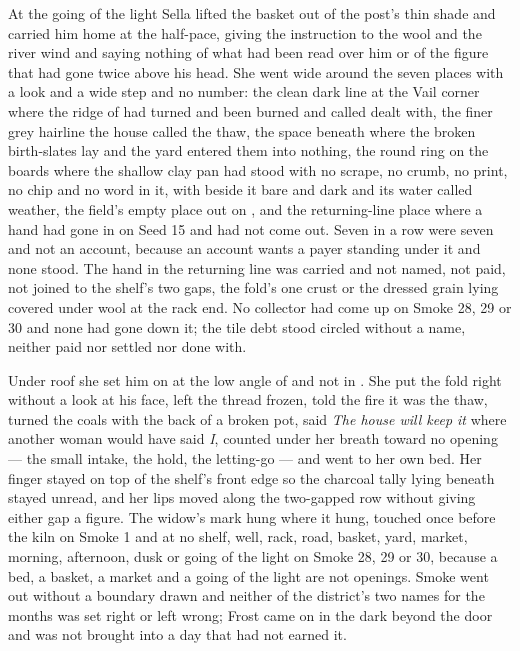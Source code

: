 \scenebreak

At the going of the light Sella lifted the basket out of the post's thin shade and carried him home at the half-pace, giving the instruction to the wool and the river wind and saying nothing of what had been read over him or of the figure that had gone twice above his head. She went wide around the seven places with a look and a wide step and no number: the clean dark line at the Vail corner where the ridge of  had turned and been burned and called dealt with, the finer grey hairline the house called the thaw, the space beneath  where the broken birth-slates lay and the yard entered them into nothing, the round ring on the boards where the shallow clay pan had stood with no scrape, no crumb, no print, no chip and no word in it,  with  beside it bare and dark and its water called weather, the field's empty place out on , and the returning-line place where a hand had gone in on Seed 15 and had not come out. Seven in a row were seven and not an account, because an account wants a payer standing under it and none stood. The hand in the returning line was carried and not named, not paid, not joined to the shelf's two gaps, the fold's one crust or the dressed grain lying covered under wool at the rack end. No collector had come up  on Smoke 28, 29 or 30 and none had gone down it; the tile debt stood circled without a name, neither paid nor settled nor done with.

Under  roof she set him on  at the low angle of  and not in . She put the fold right without a look at his face, left the thread frozen, told the fire it was the thaw, turned the coals with the back of a broken pot, said \emph{The house will keep it} where another woman would have said \emph{I}, counted under her breath toward no opening --- the small intake, the hold, the letting-go --- and went to her own bed. Her finger stayed on top of the shelf's front edge so the charcoal tally lying beneath stayed unread, and her lips moved along the two-gapped row without giving either gap a figure. The widow's mark hung where it hung, touched once before the kiln on Smoke 1 and at no shelf, well, rack, road, basket, yard, market, morning, afternoon, dusk or going of the light on Smoke 28, 29 or 30, because a bed, a basket, a market and a going of the light are not openings. Smoke went out without a boundary drawn and neither of the district's two names for the months was set right or left wrong; Frost came on in the dark beyond the door and was not brought into a day that had not earned it.

